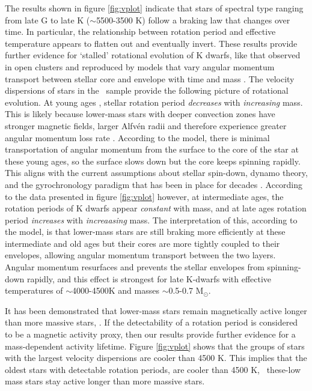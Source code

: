 The results shown in figure \ref{fig:vplot} indicate that stars of spectral
type ranging from late G to late K ($\sim$5500-3500 K) follow a braking law
that changes over time.
In particular, the relationship between rotation period and effective
temperature appears to flatten out and eventually invert.
These results provide further evidence for `stalled' rotational evolution of K
dwarfs, like that observed in open clusters \citep{curtis2019} and reproduced
by models that vary angular momentum transport between stellar core and
envelope with time and mass \citep{spada2019}.
The velocity dispersions of stars in the \mct\ sample provide the following
picture of rotational evolution.
At young ages \citep[younger than around 1 Gyr but still old enough to be on
the main sequence and have transitioned from the `I' sequence to the `C'
sequence ][]{barnes2003}, stellar rotation period {\it decreases} with {\it
increasing} mass.
This is likely because lower-mass stars with deeper convection zones have
stronger magnetic fields, larger Alfv\'en radii and therefore experience
greater angular momentum loss rate \citep[\eg][]{schatzman1962, parker1970,
kawaler1988, charbonneau2010}.
According to the \citet{spada2019} model, there is minimal transportation of
angular momentum from the surface to the core of the star at these young ages,
so the surface slows down but the core keeps spinning rapidly.
This aligns with the current assumptions about stellar spin-down, dynamo
theory, and the gyrochronology paradigm that has been in place for decades
\citep[\eg][]{skumanich1972, noyes1984, kawaler1988, barnes2003, angus2019}.
According to the data presented in figure \ref{fig:vplot} however, at
intermediate ages, the rotation periods of K dwarfs appear {\it constant} with
mass, and at late ages rotation period {\it increases} with {\it increaasing}
mass.
The interpretation of this, according to the \citet{spada2019} model, is that
lower-mass stars are still braking more efficiently at these intermediate and
old ages but their cores are more tightly coupled to their envelopes, allowing
angular momentum transport between the two layers.
Angular momentum resurfaces and prevents the stellar envelopes from
spinning-down rapidly, and this effect is strongest for late K-dwarfs with
effective temperatures of $\sim$4000-4500K and masses $\sim$0.5-0.7 M$_\odot$.

It has been demonstrated that lower-mass stars remain magnetically active
longer than more massive stars, \citep[\eg][]{west2008, kiman2019}.
If the detectability of a rotation period is considered to be a magnetic
activity proxy, then our results provide further evidence for a mass-dependent
activity lifetime.
Figure \ref{fig:vplot} shows that the groups of stars with the largest
velocity dispersions are cooler than 4500 K.
This implies that the oldest stars with detectable rotation periods, are
cooler than 4500 K, \ie\ these-low mass stars stay active longer than more
massive stars.

